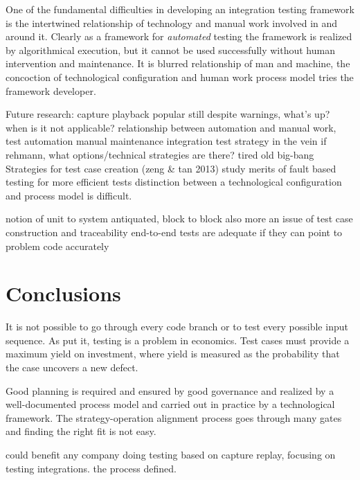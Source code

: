 \documentclass[12pt,a4paper,oneside,pdftex]{report}
\begin{document}
{One of the fundamental difficulties in developing an integration testing framework is the intertwined relationship of technology and manual work involved in and around it. Clearly as a framework for \emph{automated} testing the framework is realized by algorithmical execution, but it cannot be used successfully without human intervention and maintenance. It is blurred relationship of man and machine, the concoction of technological configuration and human work process model tries the framework developer.

Future research:
capture playback popular still despite warnings, what's up? when is it not applicable?
relationship between automation and manual work, test automation manual maintenance
integration test strategy in the vein if rehmann, what options/technical strategies are there? tired old big-bang
Strategies for test case creation (zeng & tan 2013)
study merits of fault based testing for more efficient tests
distinction between a technological configuration and process model is difficult.

notion of unit to system antiquated, block to block also
more an issue of test case construction and traceability
end-to-end tests are adequate if they can point to problem code accurately

\chapter{Conclusions}
\label{chapter:conclusions}

It is not possible to go through every code branch or to test every possible input sequence. As \citet{myers1976software} put it, testing is a problem in economics. Test cases must provide a maximum yield on investment, where yield is measured as the probability that the case uncovers a new defect. \citep{myers1976software} 

Good planning is required and ensured by good governance and realized by a well-documented process model and carried out in practice by a technological framework. The strategy-operation alignment process goes through many gates and finding the right fit is not easy.

could benefit any company doing testing based on capture replay, focusing on testing integrations. the process defined.

\begin{comment}
Inconsistent interpretation of parameters or values
Violations of value domains or of capacity or size limits
Side-effects on parameters or resrouces
Missing or misunderstood functionality
Nonfinctional problems
Dynamic mismatches
\end{comment}

}
\end{document}
